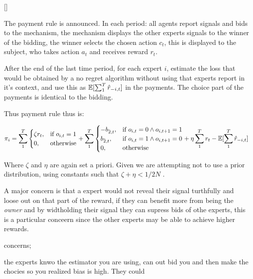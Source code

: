 \begin{mech}\label{mech:bidbandit}[]



The payment rule is announced. In each period: all agents report signals and bids to the mechanism, the mechanism displays the other experts signals to the winner of the bidding, the winner selects the chosen action $c_t$, this is displayed to the subject, who takes action $a_t$ and receives reward $r_t$.

After the end of the last time period, for each expert $i$, estimate the loss that would be obtained by a no regret algorithm without using that experts report in it's context, and use this as $\operatorname*{\mathbb E}[\sum_1^T \hat{r}_{-i,t}]$ in the payments. The choice part of the payments is identical to the bidding.


Thus payment rule thus is:


\[
    \pi_i =  \sum_1^T
\begin{cases}
    \zeta r_t ,& \text{if } o_{i,t} = 1\\
     0,              & \text{otherwise}
\end{cases}
+
\sum_1^T
\begin{cases}
     - b_{\hat{2},t} ,& \text{if } o_{i,t} = 0 \land o_{i,t+1} = 1\\
       b_{\hat{2},t} ,& \text{if } o_{i,t} = 1 \land o_{i,t+1} = 0 \\
	   0,              & \text{otherwise}
\end{cases}
  +  \eta \sum_1^T r_t -  \expec[\sum_1^T \hat{r}_{-i,t}]
\]

 

Where $\zeta$ and $\eta$ are again set a priori. Given we are attempting not to use a prior distribution, using  constants such that  $\zeta + \eta < 1/2N$ .

\end{mech}


\begin{lem}

\end{lem}


 A major concern is that a expert would not reveal their signal turthfully and loose out on that part of the reward, if they can benefit more from being the \emph{owner} and by widtholding their signal they can supress bids of othe experts, this is a particular conceern since the other experts may be able to achieve higher rewards.  



 concerns;

 the experts knwo the estimator you are using, can out bid you and then make the chocies so you realized bias is high. They could 
